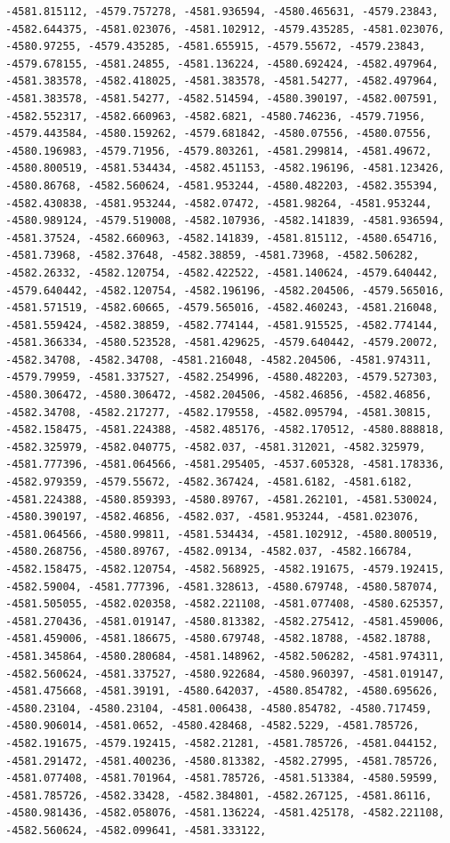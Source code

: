 \documentclass[
]{article}
\begin{document}
\begin{verbatim}
-4581.815112, -4579.757278, -4581.936594, -4580.465631, -4579.23843,  -4582.644375, -4581.023076, -4581.102912, -4579.435285, -4581.023076,  -4580.97255, -4579.435285, -4581.655915, -4579.55672, -4579.23843,  -4579.678155, -4581.24855, -4581.136224, -4580.692424, -4582.497964,  -4581.383578, -4582.418025, -4581.383578, -4581.54277, -4582.497964,  -4581.383578, -4581.54277, -4582.514594, -4580.390197, -4582.007591,  -4582.552317, -4582.660963, -4582.6821, -4580.746236, -4579.71956,  -4579.443584, -4580.159262, -4579.681842, -4580.07556, -4580.07556,  -4580.196983, -4579.71956, -4579.803261, -4581.299814, -4581.49672,  -4580.800519, -4581.534434, -4582.451153, -4582.196196, -4581.123426,  -4580.86768, -4582.560624, -4581.953244, -4580.482203, -4582.355394,  -4582.430838, -4581.953244, -4582.07472, -4581.98264, -4581.953244,  -4580.989124, -4579.519008, -4582.107936, -4582.141839, -4581.936594,  -4581.37524, -4582.660963, -4582.141839, -4581.815112, -4580.654716,  -4581.73968, -4582.37648, -4582.38859, -4581.73968, -4582.506282,  -4582.26332, -4582.120754, -4582.422522, -4581.140624, -4579.640442,  -4579.640442, -4582.120754, -4582.196196, -4582.204506, -4579.565016,  -4581.571519, -4582.60665, -4579.565016, -4582.460243, -4581.216048,  -4581.559424, -4582.38859, -4582.774144, -4581.915525, -4582.774144,  -4581.366334, -4580.523528, -4581.429625, -4579.640442, -4579.20072,  -4582.34708, -4582.34708, -4581.216048, -4582.204506, -4581.974311,  -4579.79959, -4581.337527, -4582.254996, -4580.482203, -4579.527303,  -4580.306472, -4580.306472, -4582.204506, -4582.46856, -4582.46856,  -4582.34708, -4582.217277, -4582.179558, -4582.095794, -4581.30815,  -4582.158475, -4581.224388, -4582.485176, -4582.170512, -4580.888818,  -4582.325979, -4582.040775, -4582.037, -4581.312021, -4582.325979,  -4581.777396, -4581.064566, -4581.295405, -4537.605328, -4581.178336,  -4582.979359, -4579.55672, -4582.367424, -4581.6182, -4581.6182,  -4581.224388, -4580.859393, -4580.89767, -4581.262101, -4581.530024,  -4580.390197, -4582.46856, -4582.037, -4581.953244, -4581.023076,  -4581.064566, -4580.99811, -4581.534434, -4581.102912, -4580.800519,  -4580.268756, -4580.89767, -4582.09134, -4582.037, -4582.166784,  -4582.158475, -4582.120754, -4582.568925, -4582.191675, -4579.192415,  -4582.59004, -4581.777396, -4581.328613, -4580.679748, -4580.587074,  -4581.505055, -4582.020358, -4582.221108, -4581.077408, -4580.625357,  -4581.270436, -4581.019147, -4580.813382, -4582.275412, -4581.459006,  -4581.459006, -4581.186675, -4580.679748, -4582.18788, -4582.18788,  -4581.345864, -4580.280684, -4581.148962, -4582.506282, -4581.974311,  -4582.560624, -4581.337527, -4580.922684, -4580.960397, -4581.019147,  -4581.475668, -4581.39191, -4580.642037, -4580.854782, -4580.695626,  -4580.23104, -4580.23104, -4581.006438, -4580.854782, -4580.717459,  -4580.906014, -4581.0652, -4580.428468, -4582.5229, -4581.785726,  -4582.191675, -4579.192415, -4582.21281, -4581.785726, -4581.044152,  -4581.291472, -4581.400236, -4580.813382, -4582.27995, -4581.785726,  -4581.077408, -4581.701964, -4581.785726, -4581.513384, -4580.59599,  -4581.785726, -4582.33428, -4582.384801, -4582.267125, -4581.86116,  -4580.981436, -4582.058076, -4581.136224, -4581.425178, -4582.221108,  -4582.560624, -4582.099641, -4581.333122, 
\end{verbatim}
\end{document}
